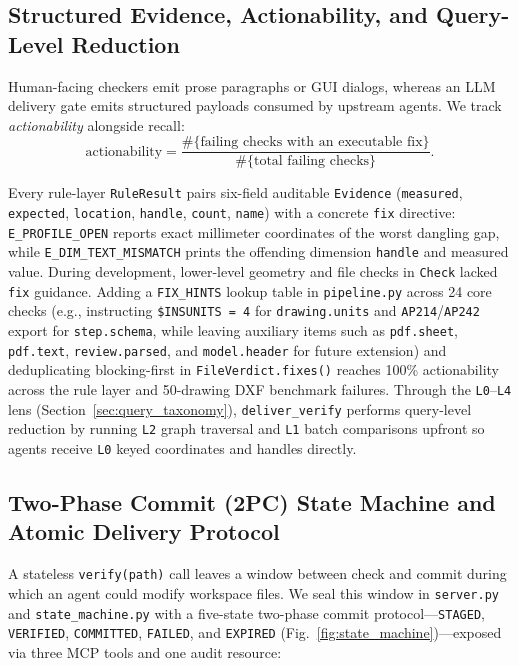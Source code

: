 \documentclass[nocopyright,nolists,upint,varvw,hyphenate]{asmejour}
\begin{document}
\subsection{Structured Evidence, Actionability, and Query-Level Reduction}\label{sec:actionability}

Human-facing checkers emit prose paragraphs or GUI dialogs, whereas an LLM delivery gate emits structured payloads consumed by upstream agents. We track \emph{actionability} alongside recall:
\begin{equation}\label{eqn:actionability}
\text{actionability} = \frac{\#\{\text{failing checks with an executable fix}\}}{\#\{\text{total failing checks}\}}.
\end{equation}

Every rule-layer \texttt{RuleResult} pairs six-field auditable \texttt{Evidence} (\texttt{measured}, \texttt{expected}, \texttt{location}, \texttt{handle}, \texttt{count}, \texttt{name}) with a concrete \texttt{fix} directive: \texttt{E\_PROFILE\_OPEN} reports exact millimeter coordinates of the worst dangling gap, while \texttt{E\_DIM\_TEXT\_MISMATCH} prints the offending dimension \texttt{handle} and measured value. During development, lower-level geometry and file checks in \texttt{Check} lacked \texttt{fix} guidance. Adding a \texttt{FIX\_HINTS} lookup table in \texttt{pipeline.py} across 24 core checks (e.g., instructing \texttt{\$INSUNITS = 4} for \texttt{drawing.units} and \texttt{AP214}/\texttt{AP242} export for \texttt{step.schema}, while leaving auxiliary items such as \texttt{pdf.sheet}, \texttt{pdf.text}, \texttt{review.parsed}, and \texttt{model.header} for future extension) and deduplicating blocking-first in \texttt{FileVerdict.fixes()} reaches 100\% actionability across the rule layer and 50-drawing DXF benchmark failures. Through the \texttt{L0}--\texttt{L4} lens (Section~\ref{sec:query_taxonomy}), \texttt{deliver\_verify} performs query-level reduction by running \texttt{L2} graph traversal and \texttt{L1} batch comparisons upfront so agents receive \texttt{L0} keyed coordinates and handles directly.

\subsection{Two-Phase Commit (2PC) State Machine and Atomic Delivery Protocol}\label{sec:2pc}

A stateless \texttt{verify(path)} call leaves a window between check and commit during which an agent could modify workspace files. We seal this window in \texttt{server.py} and \texttt{state\_machine.py} with a five-state two-phase commit protocol---\texttt{STAGED}, \texttt{VERIFIED}, \texttt{COMMITTED}, \texttt{FAILED}, and \texttt{EXPIRED} (Fig.~\ref{fig:state_machine})---exposed via three MCP tools and one audit resource:
\end{document}
